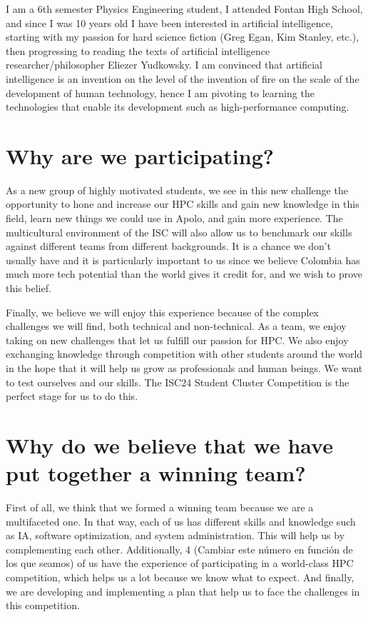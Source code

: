 \documentclass[11pt,a4paper,twocolumn]{article}
\begin{document}
I am a 6th semester Physics Engineering student, I attended Fontan High School, and since I was 10 years old I have been interested in artificial intelligence, starting with my passion for hard science fiction (Greg Egan, Kim Stanley, etc.), then progressing to reading the texts of artificial intelligence researcher/philosopher Eliezer Yudkowsky. I am convinced that artificial intelligence is an invention on the level of the invention of fire on the scale of the development of human technology, hence I am pivoting to learning the technologies that enable its development such as high-performance computing.

\section{Why are we participating?}

As a new group of highly motivated students, we see in this new challenge the opportunity to hone and increase our HPC skills and gain new knowledge in this field, learn new things we could use in Apolo, and gain more experience. The multicultural environment of the ISC will also allow us to benchmark our skills against different teams from different backgrounds. It is a chance we don’t usually have and it is particularly important to us since we believe Colombia has much more tech potential than the world gives it credit for, and we wish to prove this belief.

Finally, we believe we will enjoy this experience because of the complex challenges we will find, both technical and non-technical. As a team, we enjoy taking on new challenges that let us fulfill our passion for HPC. We also enjoy exchanging knowledge through competition with other students around the world in the hope that it will help us grow as professionals and human beings. We want to test ourselves and our skills. The ISC24 Student Cluster Competition is the perfect stage for us to do this.

\section{Why do we believe that we have put together a winning team?}

First of all, we think that we formed a winning team because we are a multifaceted one. In that way, each of us has different skills and knowledge such as IA, software optimization, and system administration. This will help us by complementing each other. Additionally, 4 (Cambiar este número en función de los que seamos) of us have the experience of participating in a world-class HPC competition, which helps us a lot because we know what to expect. And finally, we are developing and implementing a plan that help us to face the challenges in this competition.
\end{document}
